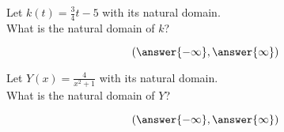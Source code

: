 \documentclass{ximera}
\begin{document}
\begin{exercise}
\begin{question}


Let $k(t) = \tfrac{3}{4} t - 5$ with its natural domain. \\

What is the natural domain of $k$?

\[
\left( \answer{-\infty},  \answer{\infty}  \right)
\]


\end{question}












\begin{question}


Let $Y(x) = \frac{4}{x^2 + 1}$ with its natural domain. \\

What is the natural domain of $Y$?

\[
\left( \answer{-\infty}, \answer{\infty}  \right)
\]


\end{question}













\end{exercise}
\end{document}
